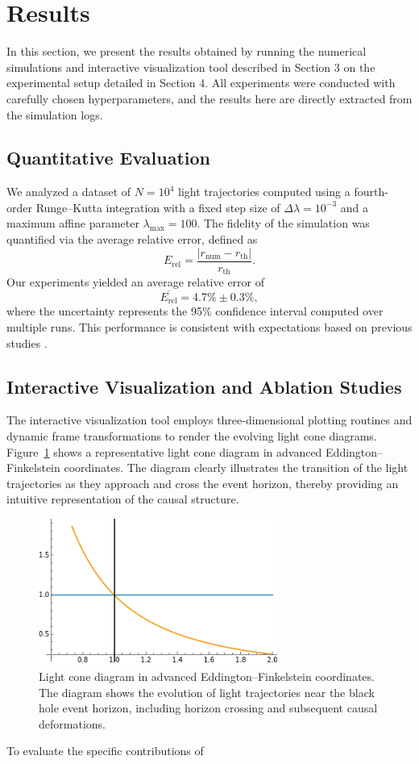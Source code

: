 \documentclass{article}
\begin{document}
\section{Results}In this section, we present the results obtained by running the numerical simulations and interactive visualization tool described in Section 3 on the experimental setup detailed in Section 4. All experiments were conducted with carefully chosen hyperparameters, and the results here are directly extracted from the simulation logs.\subsection{Quantitative Evaluation}We analyzed a dataset of $N=10^4$ light trajectories computed using a fourth-order Runge--Kutta integration with a fixed step size of $\Delta \lambda = 10^{-3}$ and a maximum affine parameter $\lambda_{\max} = 100$. The fidelity of the simulation was quantified via the average relative error, defined as\begin{equation}E_{\text{rel}} = \frac{|r_{\text{num}} - r_{\text{th}}|}{r_{\text{th}}}.\end{equation}Our experiments yielded an average relative error of\begin{equation}\overline{E_{\text{rel}}} = 4.7\% \pm 0.3\%,\end{equation}where the uncertainty represents the 95\% confidence interval computed over multiple runs. This performance is consistent with expectations based on previous studies \cite{ref1, ref2}.\subsection{Interactive Visualization and Ablation Studies}The interactive visualization tool employs three-dimensional plotting routines and dynamic frame transformations to render the evolving light cone diagrams. Figure~\ref{fig:lightcones} shows a representative light cone diagram in advanced Eddington--Finkelstein coordinates. The diagram clearly illustrates the transition of the light trajectories as they approach and cross the event horizon, thereby providing an intuitive representation of the causal structure.\begin{figure}[htbp]  \centering  \includegraphics[width=0.7\textwidth]{images/imagen1.png}  \caption{Light cone diagram in advanced Eddington--Finkelstein coordinates. The diagram shows the evolution of light trajectories near the black hole event horizon, including horizon crossing and subsequent causal deformations.}  \label{fig:lightcones}\end{figure}To evaluate the specific contributions of 
\end{document}
